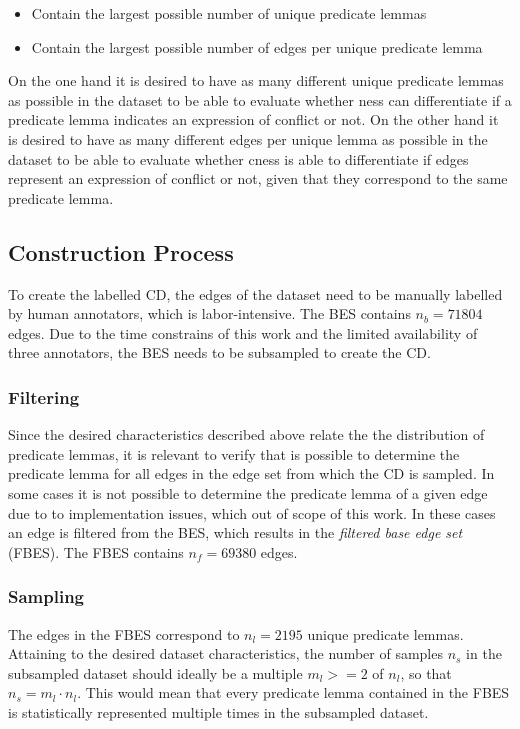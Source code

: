 \documentclass[11pt]{scrreprt}
\begin{document}
{\begin{itemize}
	\item Contain the largest possible number of unique predicate lemmas
	\item Contain the largest possible number of edges per unique predicate lemma
\end{itemize}

On the one hand it is desired to have as many different unique predicate lemmas as possible in the dataset to be able to evaluate whether \gls{ness} can differentiate if a predicate lemma indicates an expression of conflict or not. On the other hand it is desired to have as many different edges per unique lemma as possible in the dataset to be able to evaluate whether \gls{cness} is able to differentiate if edges represent an expression of conflict or not, given that they correspond to the same predicate lemma.

\subsection{Construction Process}
To create the labelled CD, the edges of the dataset need to be manually labelled by human annotators, which is labor-intensive. The BES contains \(n_b=71804\) edges. Due to the time constrains of this work and the limited availability of three annotators, the BES needs to be subsampled to create the CD. 

\subsubsection{Filtering}
Since the desired characteristics described above relate the the distribution of predicate lemmas, it is relevant to verify that is possible to determine the predicate lemma for all edges in the edge set from which the CD is sampled. In some cases it is not possible to determine the predicate lemma of a given edge due to to implementation issues, which out of scope of this work. In these cases an edge is filtered from the BES, which results in the \textit{filtered base edge set} (FBES). The FBES contains \(n_{f} = 69 380\) edges. 


\subsubsection{Sampling} 
The edges in the FBES correspond to \(n_{l} = 2195\) unique predicate lemmas. Attaining to the desired dataset characteristics, the number of samples \(n_{s}\) in the subsampled dataset should ideally be a multiple \(m_{l} >= 2\) of \(n_{l}\), so that \(n_{s} = m_{l} \cdot  n_{l}\). This would mean that every predicate lemma contained in the FBES is statistically represented multiple times in the subsampled dataset.

}
\end{document}
